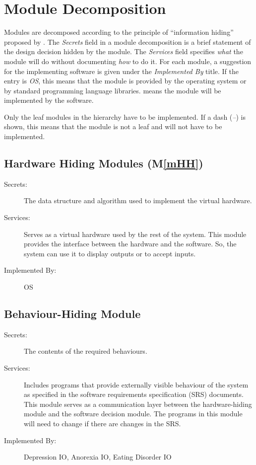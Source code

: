 \documentclass[12pt, titlepage]{article}
\newcommand{\mref}[1]{M\ref{#1}}
\begin{document}
\section{Module Decomposition} \label{SecMD}

Modules are decomposed according to the principle of ``information hiding''
proposed by \citet{ParnasEtAl1984}. The \emph{Secrets} field in a module
decomposition is a brief statement of the design decision hidden by the
module. The \emph{Services} field specifies \emph{what} the module will do
without documenting \emph{how} to do it. For each module, a suggestion for the
implementing software is given under the \emph{Implemented By} title. If the
entry is \emph{OS}, this means that the module is provided by the operating
system or by standard programming language libraries.  \emph{\progname{}} means the
module will be implemented by the \progname{} software.

Only the leaf modules in the hierarchy have to be implemented. If a dash
(\emph{--}) is shown, this means that the module is not a leaf and will not have
to be implemented.

\subsection{Hardware Hiding Modules (\mref{mHH})}

\begin{description}
\item[Secrets:]The data structure and algorithm used to implement the virtual
  hardware.
\item[Services:]Serves as a virtual hardware used by the rest of the
  system. This module provides the interface between the hardware and the
  software. So, the system can use it to display outputs or to accept inputs.
\item[Implemented By:] OS
\end{description}

\subsection{Behaviour-Hiding Module}

\begin{description}
\item[Secrets:]The contents of the required behaviours.
\item[Services:]Includes programs that provide externally visible behaviour of
  the system as specified in the software requirements specification (SRS)
  documents. This module serves as a communication layer between the
  hardware-hiding module and the software decision module. The programs in this
  module will need to change if there are changes in the SRS.
\item[Implemented By:] Depression IO, Anorexia IO, Eating Disorder IO
\end{description}
\end{document}
